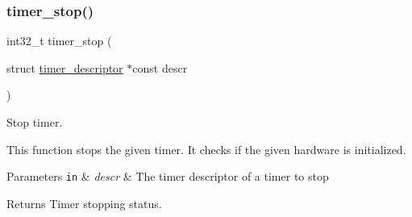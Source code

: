 \subsubsection{\texorpdfstring{timer\+\_\+stop()}{timer\_stop()}}
{\footnotesize\ttfamily int32\+\_\+t timer\+\_\+stop (\begin{DoxyParamCaption}\item[{struct \hyperlink{structtimer__descriptor}{timer\+\_\+descriptor} $\ast$const}]{descr }\end{DoxyParamCaption})}



Stop timer. 

This function stops the given timer. It checks if the given hardware is initialized.


\begin{DoxyParams}[1]{Parameters}
\mbox{\tt in}  & {\em descr} & The timer descriptor of a timer to stop\\
\hline
\end{DoxyParams}
\begin{DoxyReturn}{Returns}
Timer stopping status. 
\end{DoxyReturn}
